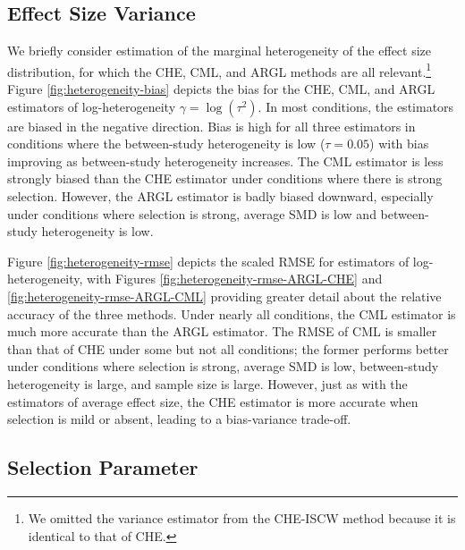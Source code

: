\documentclass[
  american,
  man, donotrepeattitle,floatsintext]{apa7}
\begin{document}
\subsection{Effect Size Variance}\label{effect-size-variance}

We briefly consider estimation of the marginal heterogeneity of the effect size distribution, for which the CHE, CML, and ARGL methods are all relevant.\footnote{We omitted the variance estimator from the CHE-ISCW method because it is identical to that of CHE.}
Figure \ref{fig:heterogeneity-bias} depicts the bias for the CHE, CML, and ARGL estimators of log-heterogeneity \(\gamma = \log(\tau^2)\).
In most conditions, the estimators are biased in the negative direction. Bias is high for all three estimators in conditions where the between-study heterogeneity is low (\(\tau = 0.05\)) with bias improving as between-study heterogeneity increases. The CML estimator is less strongly biased than the CHE estimator under conditions where there is strong selection.
However, the ARGL estimator is badly biased downward, especially under conditions where selection is strong, average SMD is low and between-study heterogeneity is low.

Figure \ref{fig:heterogeneity-rmse} depicts the scaled RMSE for estimators of log-heterogeneity, with Figures \ref{fig:heterogeneity-rmse-ARGL-CHE} and \ref{fig:heterogeneity-rmse-ARGL-CML} providing greater detail about the relative accuracy of the three methods.
Under nearly all conditions, the CML estimator is much more accurate than the ARGL estimator.
The RMSE of CML is smaller than that of CHE under some but not all conditions; the former performs better under conditions where selection is strong, average SMD is low, between-study heterogeneity is large, and sample size is large.
However, just as with the estimators of average effect size, the CHE estimator is more accurate when selection is mild or absent, leading to a bias-variance trade-off.

\subsection{Selection Parameter}\label{selection-parameter}
\end{document}

